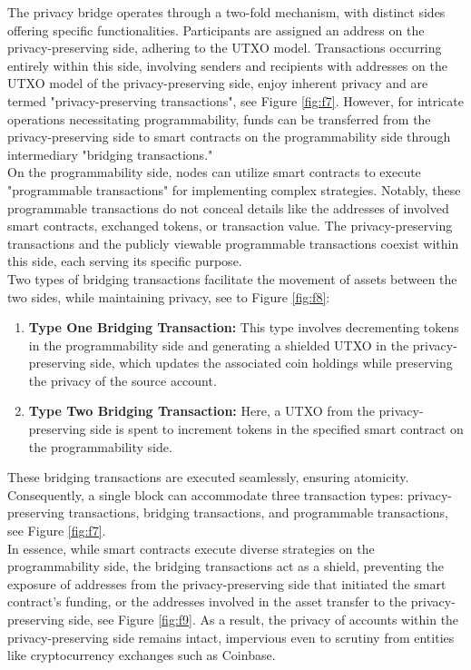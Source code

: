 \documentclass{report}
\begin{document}
The privacy bridge operates through a two-fold mechanism, with distinct sides offering specific functionalities. Participants are assigned an address on the privacy-preserving side, adhering to the UTXO model. Transactions occurring entirely within this side, involving senders and recipients with addresses on the UTXO model of the privacy-preserving side, enjoy inherent privacy and are termed "privacy-preserving transactions", see Figure \ref{fig:f7}. However, for intricate operations necessitating programmability, funds can be transferred from the privacy-preserving side to smart contracts on the programmability side through intermediary "bridging transactions."\\
On the programmability side, nodes can utilize smart contracts to execute "programmable transactions" for implementing complex strategies. Notably, these programmable transactions do not conceal details like the addresses of involved smart contracts, exchanged tokens, or transaction value. The privacy-preserving transactions and the publicly viewable programmable transactions coexist within this side, each serving its specific purpose.\\
Two types of bridging transactions facilitate the movement of assets between the two sides, while maintaining privacy, see to Figure \ref{fig:f8}:
\begin{enumerate}
	\item \textbf{Type One Bridging Transaction:} This type involves decrementing tokens in the programmability side and generating a shielded UTXO in the privacy-preserving side, which updates the associated coin holdings while preserving the privacy of the source account.
	\item \textbf{Type Two Bridging Transaction:} Here, a UTXO from the privacy-preserving side is spent to increment tokens in the specified smart contract on the programmability side.
\end{enumerate}
These bridging transactions are executed seamlessly, ensuring atomicity. Consequently, a single block can accommodate three transaction types: privacy-preserving transactions, bridging transactions, and programmable transactions, see Figure \ref{fig:f7}.\\
In essence, while smart contracts execute diverse strategies on the programmability side, the bridging transactions act as a shield, preventing the exposure of addresses from the privacy-preserving side that initiated the smart contract's funding, or the addresses involved in the asset transfer to the privacy-preserving side, see Figure \ref{fig:f9}. As a result, the privacy of accounts within the privacy-preserving side remains intact, impervious even to scrutiny from entities like cryptocurrency exchanges such as Coinbase.
\end{document}

